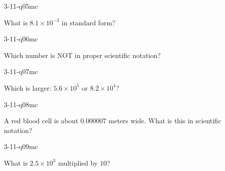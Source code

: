 \begin{practiceQuestion}{3-11-q05}{mc}
\begin{questionText}
What is $8.1 \times 10^{-3}$ in standard form?
\end{questionText}
\end{practiceQuestion}

\begin{practiceQuestion}{3-11-q06}{mc}
\begin{questionText}
Which number is NOT in proper scientific notation?
\end{questionText}
\end{practiceQuestion}

\begin{practiceQuestion}{3-11-q07}{mc}
\begin{questionText}
Which is larger: $5.6 \times 10^5$ or $8.2 \times 10^4$?
\end{questionText}
\end{practiceQuestion}

\begin{practiceQuestion}{3-11-q08}{mc}
\begin{questionText}
A red blood cell is about $0.000007$ meters wide. What is this in scientific notation?
\end{questionText}
\end{practiceQuestion}

\begin{practiceQuestion}{3-11-q09}{mc}
\begin{questionText}
What is $2.5 \times 10^3$ multiplied by $10$?
\end{questionText}
\end{practiceQuestion}

